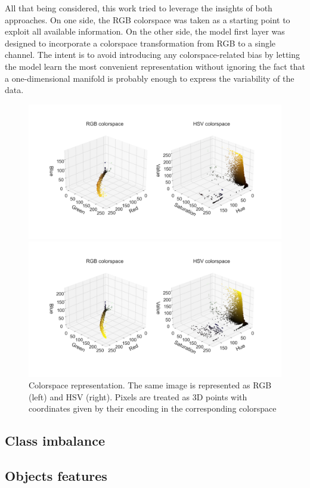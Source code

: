 All that being considered, this work tried to leverage the insights of both approaches. 
On one side, the RGB colorspace was taken as a starting point to exploit all available information. On the other side, the model first layer was designed to incorporate a colorspace transformation from RGB to a single channel.
The intent is to avoid introducing any colorspace-related bias by letting the model learn the most convenient representation without ignoring the fact that a one-dimensional manifold is probably enough to express the variability of the data.
\begin{figure}
    \centering
    \includegraphics[width=1.1\textwidth]{figures/120_dataset/colorspace_Mar23bS1C2R3_VLPAGl_200x_y.png}
    
    \centering
    \includegraphics[width=1.1\textwidth]{figures/120_dataset/colorspace_Mar26bS2C1R2_DMl_200x_y.png}
    \caption{Colorspace representation. The same image is represented as RGB (left) and HSV (right). Pixels are treated as 3D points with coordinates given by their encoding in the corresponding colorspace}
    \label{fig:dataset:colorspace}
\end{figure}

\subsection{Class imbalance}


\subsection{Objects features}

